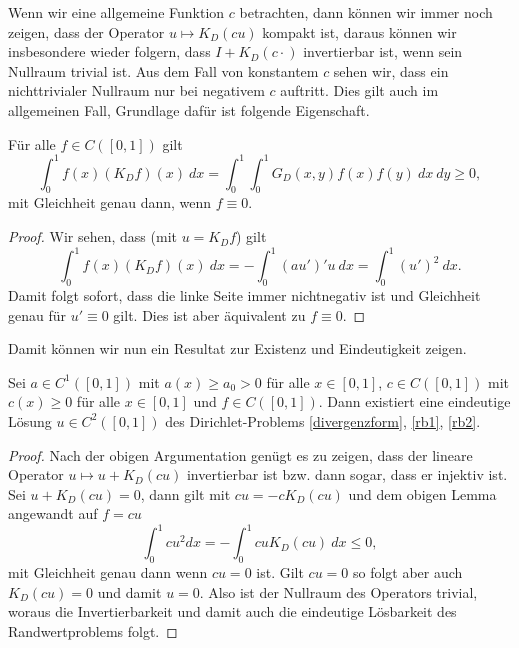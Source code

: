 Wenn wir eine allgemeine Funktion $c$ betrachten, dann können wir immer noch zeigen, dass der Operator $u \mapsto K_D (cu)$ kompakt ist, daraus können wir insbesondere wieder folgern, dass $I+K_D(c \cdot)$ invertierbar ist, wenn sein Nullraum trivial ist. Aus dem Fall von konstantem $c$ sehen wir, dass ein nichttrivialer Nullraum nur bei negativem $c$ auftritt. Dies gilt auch im allgemeinen Fall, Grundlage dafür ist folgende Eigenschaft.
%
\begin{lemma}{}{}
Für alle $f \in C([0,1])$ gilt
$$ \int_0^1 f(x) (K_D f)(x)~dx = \int_0^1 \int_0^1 G_D(x,y) f(x)f(y)~dx~dy \geq 0, $$
mit Gleichheit genau dann, wenn $f \equiv 0$. 
\end{lemma} 
\begin{proof}
Wir sehen, dass (mit $u=K_Df$) gilt
$$ \int_0^1 f(x) (K_D f)(x)~dx = - \int_0^1 (a u')' u ~dx = \int_0^1 (u')^2 ~dx. $$
Damit folgt sofort, dass die linke Seite immer nichtnegativ ist und Gleichheit genau f\"ur $u'\equiv 0$ gilt. Dies ist aber \"aquivalent zu $f \equiv 0$.
\end{proof}

Damit können wir nun ein Resultat zur Existenz und Eindeutigkeit zeigen.
\begin{theorem}
Sei $a \in C^1([0,1])$ mit $a(x) \geq a_0 > 0$ f\"ur alle $x \in [0,1]$, $c  \in C([0,1])$ mit $c(x) \geq 0$ f\"ur alle $x\in [0,1]$ und $f \in C([0,1])$. Dann existiert eine eindeutige L\"osung $u \in C^2([0,1])$ des Dirichlet-Problems \eqref{divergenzform}, \eqref{rb1}, \eqref{rb2}. 
\end{theorem} 
\begin{proof}
Nach der obigen Argumentation gen\"ugt es zu zeigen, dass der lineare Operator $u\mapsto u+ K_D(cu)$ invertierbar ist bzw. dann sogar, dass er injektiv ist. Sei $u+ K_D(cu) = 0$, dann gilt mit $cu = - c K_D(cu)$ und dem obigen Lemma angewandt auf $f=cu$
$$ \int_0^1 c u^2 dx = - \int_0^1 c u K_D(cu) ~dx \leq 0, $$
mit Gleichheit genau dann wenn $cu = 0$ ist. Gilt $cu = 0$ so folgt aber auch $K_D(cu) = 0$ und damit $u=0$. Also ist der Nullraum des Operators trivial, woraus die Invertierbarkeit und damit auch die eindeutige L\"osbarkeit des Randwertproblems folgt.
\end{proof}

